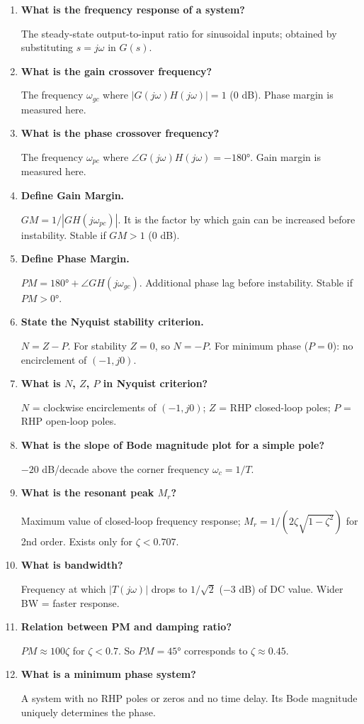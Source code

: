 \documentclass[12pt,a4paper]{article}
\newcommand{\Q}[1]{\textbf{#1}\par\noindent\ignorespaces}
\begin{document}
\begin{tcolorbox}[exambox, title={\textbf{Frequently Asked / Viva Questions}}]
\begin{enumerate}[leftmargin=*, topsep=0pt, label=\textbf{Q\arabic*.}, itemsep=8pt]
  \item \Q{What is the frequency response of a system?} The steady-state output-to-input ratio for sinusoidal inputs; obtained by substituting $s=j\omega$ in $G(s)$.
  \item \Q{What is the gain crossover frequency?} The frequency $\omega_{gc}$ where $|G(j\omega)H(j\omega)|=1$ (0 dB). Phase margin is measured here.
  \item \Q{What is the phase crossover frequency?} The frequency $\omega_{pc}$ where $\angle G(j\omega)H(j\omega)=-180°$. Gain margin is measured here.
  \item \Q{Define Gain Margin.} $GM = 1/|GH(j\omega_{pc})|$. It is the factor by which gain can be increased before instability. Stable if $GM > 1$ (0 dB).
  \item \Q{Define Phase Margin.} $PM = 180° + \angle GH(j\omega_{gc})$. Additional phase lag before instability. Stable if $PM > 0°$.
  \item \Q{State the Nyquist stability criterion.} $N = Z - P$. For stability $Z=0$, so $N=-P$. For minimum phase ($P=0$): no encirclement of $(-1,j0)$.
  \item \Q{What is $N$, $Z$, $P$ in Nyquist criterion?} $N$ = clockwise encirclements of $(-1,j0)$; $Z$ = RHP closed-loop poles; $P$ = RHP open-loop poles.
  \item \Q{What is the slope of Bode magnitude plot for a simple pole?} $-20$ dB/decade above the corner frequency $\omega_c = 1/T$.
  \item \Q{What is the resonant peak $M_r$?} Maximum value of closed-loop frequency response; $M_r = 1/(2\zeta\sqrt{1-\zeta^2})$ for 2nd order. Exists only for $\zeta < 0.707$.
  \item \Q{What is bandwidth?} Frequency at which $|T(j\omega)|$ drops to $1/\sqrt{2}$ ($-3$ dB) of DC value. Wider BW = faster response.
  \item \Q{Relation between PM and damping ratio?} $PM \approx 100\zeta$ for $\zeta < 0.7$. So $PM = 45°$ corresponds to $\zeta \approx 0.45$.
  \item \Q{What is a minimum phase system?} A system with no RHP poles or zeros and no time delay. Its Bode magnitude uniquely determines the phase.
\end{enumerate}
\end{tcolorbox}
\end{document}

